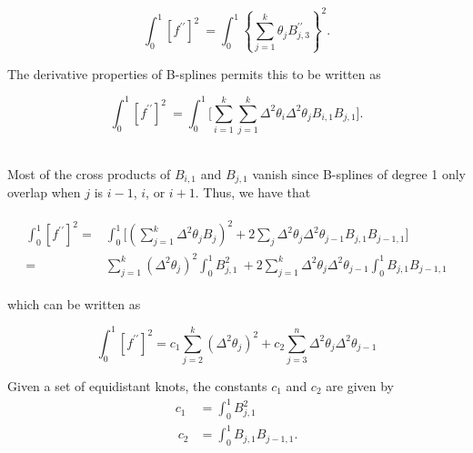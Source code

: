 \begin{equation*} 
\int_0^1 \left[ f^{\prime \prime}\right]^2\ = \int_{0}^{1} \left\{ \sum\limits_{j=1}^k  \theta_j B_{j,3}^{\prime \prime} \right\}^2.
\end{equation*}

\noindent
The derivative properties of B-splines permits this to be written as 

\begin{equation*} \label{eq:second-derivative-bspline-penalty}
\int_0^1 \left[ f^{\prime \prime}\right]^2\ =  \int_{0}^{1}  \bigg[ \sum\limits_{i=1}^k \sum\limits_{j=1}^k \Delta^2 \theta_i \Delta^2 \theta_j B_{i,1}B_{j,1}\bigg]. 
\end{equation*}

\noindent
\\
Most of the cross products of $B_{i,1}$ and $B_{j,1}$ vanish since B-splines of degree 1 only overlap when $j$ is $i-1$, $i$, or $i+1$. Thus, we have that

\begin{align}
\begin{split}
\int_0^1 \left[ f^{\prime \prime}\right]^2  = {} &  \int_0^1 \bigg[ \left( \sum\limits_{j=1}^k   \Delta^2 \theta_j  B_j \right)^2  + 2 \sum_{j}\Delta^2 \theta_j\Delta^2 \theta_{j-1}B_{j,1}B_{j-1,1} \bigg]\\ 
= {} & \sum \limits_{j=1}^k  \left( \Delta^2\theta_j \right)^2 \int_0^1 B_{j,1}^2\ + 2 \sum\limits_{j=1}^k \Delta^2 \theta_j\Delta^2 \theta_{j-1} \int_0^1 B_{j,1}B_{j-1,1} 
\end{split}
\end{align}

\noindent
which can be written as

\begin{equation} \label{eq:derivative-penalty-difference-penalty-connection}
\int_0^1 \left[ f^{\prime \prime}\right]^2  = c_1 \sum\limits_{j=2}^k \left( \Delta^2 \theta_j\right)^2 + c_2 \sum\limits_{j=3}^n \Delta^2 \theta_j\Delta^2 \theta_{j-1}
\end{equation}

\noindent
Given a set of equidistant knots, the constants $c_1$ and $c_2$ are given by
\begin{equation}
\begin{split}
c_1 & =   \int_0^1 B_{j,1}^2\\\
c_2 & = \int_0^1 B_{j,1}B_{j-1,1}.
\end{split}
\end{equation}


